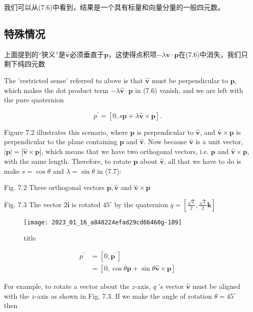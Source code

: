 我们可以从(7.6)中看到，结果是一个具有标量和向量分量的一般四元数。

\subsection{特殊情况}
上面提到的“狭义”是$\hat{\mathbf{v}}$必须垂直于$\mathbf{p}$，这使得点积项$-\lambda \hat{\mathbf{v}} \cdot \mathbf{p}$在(7.6)中消失，我们只剩下纯四元数

The 'restricted sense' referred to above is that $\hat{\mathbf{v}}$ must be perpendicular to $\mathbf{p}$, which makes the dot product term $-\lambda \hat{\mathbf{v}} \cdot \mathbf{p}$ in (7.6) vanish, and we are left with the pure quaternion

$$
p^{\prime}=[0, s \mathbf{p}+\lambda \hat{\mathbf{v}} \times \mathbf{p}] .
$$

Figure $7.2$ illustrates this scenario, where $\mathbf{p}$ is perpendicular to $\hat{\mathbf{v}}$, and $\hat{\mathbf{v}} \times \mathbf{p}$ is perpendicular to the plane containing $\mathbf{p}$ and $\hat{\mathbf{v}}$. Now because $\hat{\mathbf{v}}$ is a unit vector, $|\mathbf{p}|=|\hat{\mathbf{v}} \times \mathbf{p}|$, which means that we have two orthogonal vectors, i.e. $\mathbf{p}$ and $\hat{\mathbf{v}} \times \mathbf{p}$, with the same length. Therefore, to rotate $\mathbf{p}$ about $\hat{\mathbf{v}}$, all that we have to do is make $s=\cos \theta$ and $\lambda=\sin \theta$ in (7.7):

Fig. 7.2 Three orthogonal vectors $\mathbf{p}, \hat{\mathbf{v}}$ and $\hat{\mathbf{v}} \times \mathbf{p}$

Fig. 7.3 The vector $2 \mathbf{i}$ is rotated $45^{\circ}$ by the quaternion $q=\left[\frac{\sqrt{2}}{2}, \frac{\sqrt{2}}{2} \mathbf{k}\right]$
\begin{figure}
    \texttt{[image: 2023\_01\_16\_a848224efad29cd66460g-109]}
    \caption[short]{title}
\end{figure}




$$
\begin{aligned}
p^{\prime} & =\left[0, \mathbf{p}^{\prime}\right] \\
& =[0, \cos \theta \mathbf{p}+\sin \theta \hat{\mathbf{v}} \times \mathbf{p}]
\end{aligned}
$$

For example, to rotate a vector about the $z$-axis, $q$ 's vector $\hat{\mathbf{v}}$ must be aligned with the $z$-axis as shown in Fig. 7.3. If we make the angle of rotation $\theta=45^{\circ}$ then

